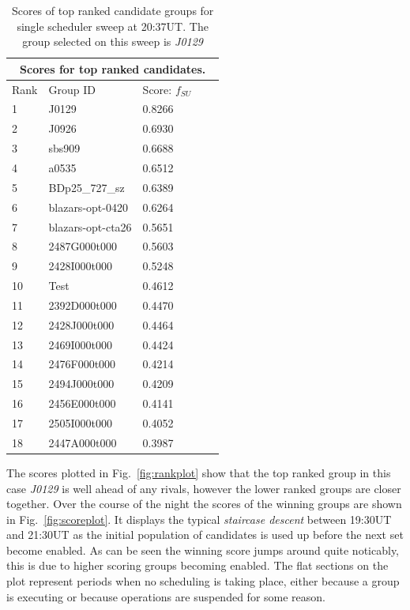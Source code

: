 {{\begin{table}[htbp]
\begin{center}
\begin{tabular}{lllll}
\toprule
\multicolumn{5}{c}{Scores for top ranked candidates.} \\
\midrule
Rank & Group ID & Score: $f_{SU}$ \\
\midrule
1 & J0129 & 0.8266 \\
2 & J0926 & 0.6930 \\
3 & sbs909 & 0.6688 \\
4 & a0535 & 0.6512 \\
5 & BDp25\_727\_sz & 0.6389 \\
6 & blazars-opt-0420 & 0.6264 \\
7 & blazars-opt-cta26 & 0.5651 \\
8 & 2487G000t000 & 0.5603 \\
9 & 2428I000t000 & 0.5248 \\
10 & Test & 0.4612 \\
11 & 2392D000t000 & 0.4470 \\
12 & 2428J000t000 & 0.4464 \\
13 & 2469I000t000 & 0.4424 \\
14 & 2476F000t000 & 0.4214 \\
15 & 2494J000t000 & 0.4209 \\
16 & 2456E000t000 & 0.4141 \\
17 & 2505I000t000 & 0.4052 \\
18 & 2447A000t000 & 0.3987 \\
\bottomrule
\end{tabular}
\end{center}
\caption[Scores of top ranked candidate groups for single scheduler sweep.]
{Scores of top ranked candidate groups for single scheduler sweep at 20:37UT. The group selected on this sweep is \emph{J0129}}
\label{tab:scores}
\end{table}

The scores plotted in Fig.~\ref{fig:rankplot} show that the top ranked group in this case \emph{J0129} is well ahead of any rivals, however the lower ranked groups are closer together. Over the course of the night the scores of the winning groups are shown in Fig.~\ref{fig:scoreplot}. It displays the typical \emph{staircase descent} between 19:30UT and 21:30UT as the initial population of candidates is used up before the next set become enabled. As can be seen the winning score jumps around quite noticably, this is due to higher scoring groups becoming enabled. The flat sections on the plot represent periods when no scheduling is taking place, either because a group is executing or because operations are suspended for some reason.

}}
